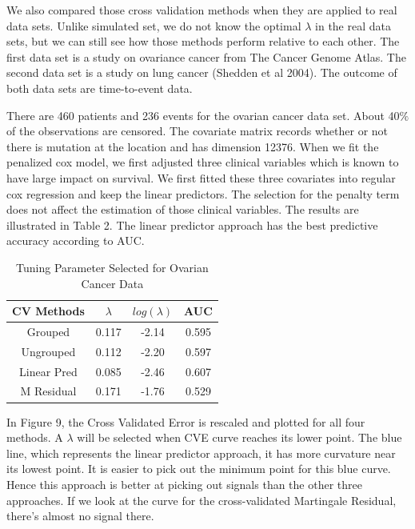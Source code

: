 \documentclass{article}\usepackage[]{graphicx}\usepackage[]{color}
\begin{document}
We also compared those cross validation methods when they are applied to real data sets. Unlike simulated set, we do not know the optimal $\lambda$ in the real data sets, but we can still see how those methods perform relative to each other. The first data set is a study on ovariance cancer from The Cancer Genome Atlas. The second data set is a study on lung cancer (Shedden et al 2004). The outcome of both data sets are time-to-event data.

There are 460 patients and 236 events for the ovarian cancer data set. About 40$\%$ of the observations are censored. The covariate matrix records whether or not there is mutation at the location and has dimension 12376. When we fit the penalized cox model, we first adjusted three clinical variables which is known to have large impact on survival. We first fitted these three covariates into regular cox regression and keep the linear predictors. The selection for the penalty term does not affect the estimation of those clinical variables. The results are illustrated in Table 2. The linear predictor approach has the best predictive accuracy according to AUC. 

\begin{table}[h]
\centering
  \begin{tabular}{ c | c | c | c}
				CV Methods & $\lambda$ & $log(\lambda)$ &AUC \\
				\hline \hline
				Grouped  &  0.117 & -2.14 &   0.595\\
				Ungrouped &  0.112 & -2.20 &  0.597\\
				Linear Pred &  0.085 & -2.46 &     0.607\\
				M Residual & 0.171 & -1.76 & 0.529 
	\end{tabular}
  \caption{Tuning Parameter Selected for Ovarian Cancer Data}
\end{table}


In Figure 9, the Cross Validated Error is rescaled and plotted for all four methods. A $\lambda$ will be selected when CVE curve reaches its lower point. The blue line, which represents the linear predictor approach, it has more curvature near its lowest point. It is easier to pick out the minimum point for this blue curve. Hence this approach is better at picking out signals than the other three approaches. If we look at the curve for the cross-validated Martingale Residual, there's almost no signal there.
\end{document}
